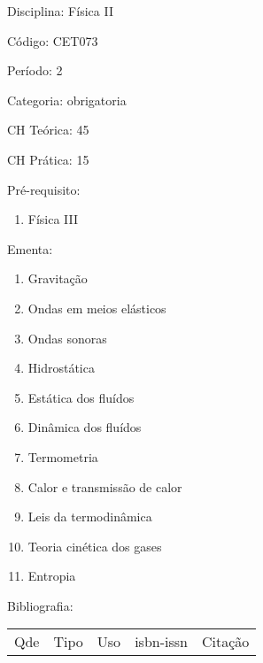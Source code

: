 \documentclass[12pt,a4paper,twoside]{report}
\begin{document}
Disciplina: Física II

Código: CET073

Período: 2

Categoria: obrigatoria

CH Teórica: 45

CH Prática: 15




Pré-requisito:
\begin{enumerate}
\item Física III
\end{enumerate}

Ementa:
\begin{enumerate}
\item Gravitação
\item Ondas em meios elásticos
\item Ondas sonoras
\item Hidrostática
\item Estática dos fluídos
\item Dinâmica dos fluídos
\item Termometria
\item Calor e transmissão de calor
\item Leis da termodinâmica
\item Teoria cinética dos gases
\item Entropia
\end{enumerate}



Bibliografia:


\begin{tabular}{llllp{8cm}}
Qde & Tipo & Uso & isbn-issn & Citação \\
\end{tabular}
\end{document}
